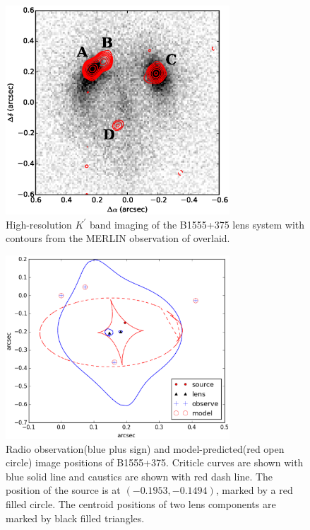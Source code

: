 \documentclass[useAMS,usenatbib]{mn2e}
\begin{document}
\begin{figure}
\includegraphics[width=84mm]{1555_ao_merlin_overlay.eps}
\caption{High-resolution  $K^\prime$ band imaging of the B1555+375 lens system 
with contours from the MERLIN observation of \citet{Marlow99} overlaid. 
%
\label{fig:merlin}}
\end{figure}


\begin{figure}
\includegraphics[width=84mm]{gravlens_exp_try5_plot.eps}
\caption{Radio observation(blue plus sign) and model-predicted(red open circle) image positions of B1555+375. Criticle curves are shown with blue solid line and caustics are shown with red dash line. The position of the source is at $(-0.1953,-0.1494)$, marked by a red filled circle. The centroid positions of two lens components are marked by black filled triangles.  \label{fig2}}
\end{figure}

\end{document}
